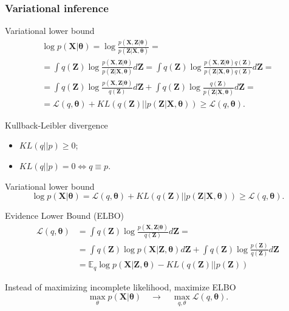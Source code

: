 \documentclass{beamer}
\newcommand{\bX}{\mathbf{X}}
\newcommand{\bZ}{\mathbf{Z}}
\newcommand{\btheta}{\boldsymbol{\theta}}
\begin{document}
\subsubsection{Variational inference}
\begin{frame}{Variational lower bound}
	\begin{multline*}
		\log p(\bX| \btheta) 
		= \log \frac{p(\bX, \bZ| \btheta)}{p(\bZ|\bX, \btheta)} = \\ 
		= \int q(\bZ) \log \frac{p(\bX, \bZ| \btheta)}{p(\bZ|\bX, \btheta)}d\bZ
		= \int q(\bZ) \log \frac{p(\bX, \bZ| \btheta) q(\bZ)}{p(\bZ|\bX, \btheta) q(\bZ)} d\bZ = \\
		= \int q(\bZ) \log \frac{p(\bX, \bZ | \btheta)}{q(\bZ)}d\bZ + \int q(\bZ) \log \frac{q(\bZ)}{p(\bZ|\bX, \btheta)}d\bZ = \\ 
		= \mathcal{L} (q, \btheta) + KL(q(\bZ) || p(\bZ|\bX, \btheta)) \geq \mathcal{L} (q, \btheta).
	\end{multline*}
	\begin{block}{Kullback-Leibler divergence}
	    \begin{itemize}
	        \item $KL(q || p) \geq 0$;
	        \item $KL(q || p) = 0 \Leftrightarrow q \equiv p$.
	    \end{itemize}
	\end{block}
\end{frame}
\begin{frame}{Variational lower bound}
\[
    \log p(\bX| \btheta) = \mathcal{L} (q, \btheta) + KL(q(\bZ) || p(\bZ|\bX, \btheta)) \geq \mathcal{L} (q, \btheta).
\]
\begin{block}{Evidence Lower Bound (ELBO)}
\begin{align*}
    \mathcal{L} (q, \btheta) &= \int q(\bZ) \log \frac{p(\bX, \bZ | \btheta)}{q(\bZ)}d\bZ = \\ 
    &= \int q(\bZ) \log p(\bX | \bZ, \btheta) d\bZ + \int q(\bZ) \log \frac{p(\bZ)}{q(\bZ)}d\bZ \\ 
    &= \mathbb{E}_{q} \log p(\bX | \bZ, \btheta) - KL (q(\bZ) || p(\bZ))
\end{align*}
\end{block}
Instead of maximizing incomplete likelihood, maximize ELBO
\[
    \max_{\theta} p(\bX | \btheta) \quad \rightarrow \quad \max_{q, \theta} \mathcal{L} (q, \btheta).
\]
    
\end{frame}
\end{document}
